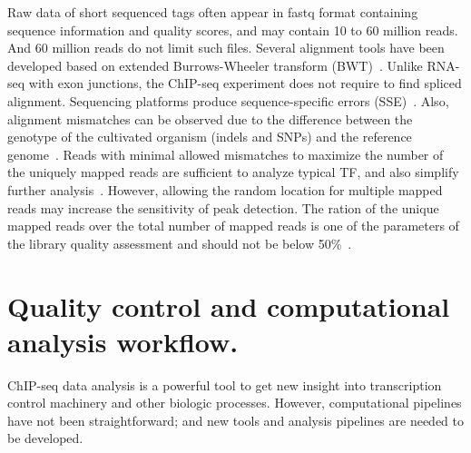 Raw data of short sequenced tags often appear in fastq format containing sequence information and quality scores, and may contain 10 to 60 million reads. 
And 60 million reads do not limit such files.
Several alignment tools have been developed based on extended Burrows-Wheeler transform (BWT)~\cite{li2009fast, siren2014indexing}.
Unlike RNA-seq with exon junctions, the ChIP-seq experiment does not require to find spliced alignment. 
Sequencing platforms produce sequence-specific errors (SSE)~\cite{nakamura2011sequence}. 
Also, alignment mismatches can be observed due to the difference between the genotype of the cultivated organism (indels and SNPs) and the reference genome~\cite{park2009chip}.
Reads with minimal allowed mismatches to maximize the number of the uniquely mapped reads are sufficient to analyze typical TF, and also simplify further analysis~\cite{derrien2012fast}.
However, allowing the random location for multiple mapped reads may increase the sensitivity of peak detection. 
The ration of the unique mapped reads over the total number of mapped reads is one of the parameters of the library quality assessment and should not be below 50\%~\cite{shin2013computational}.

\section{Quality control and computational analysis workflow.}


ChIP-seq data analysis is a powerful tool to get new insight into transcription control machinery and other biologic processes. 
However, computational pipelines have not been straightforward; 
and new tools and analysis pipelines are needed to be developed.

